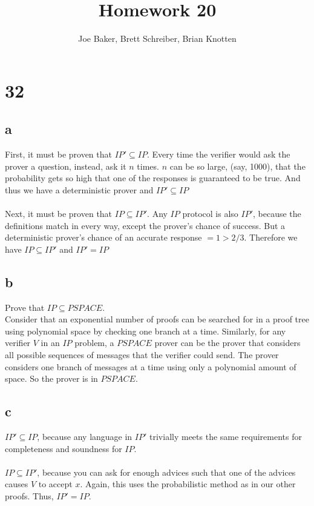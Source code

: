 \documentclass[letterpaper,notitlepage,twoside]{article}
\begin{document}
\title{Homework 20}
\author{Joe Baker, Brett Schreiber, Brian Knotten}
\maketitle

\section*{32}
\subsection*{a}
First, it must be proven that $IP' \subseteq IP$.
Every time the verifier would ask the prover a question, instead, ask it $n$ times. $n$ can be so large, (say, 1000), that the
probability gets so high that one of the responses is guaranteed to be true. And thus we have a deterministic prover and $IP' \subseteq IP$ \\\\
Next, it must be proven that $IP \subseteq IP'$.
Any $IP$ protocol is also $IP'$, because the definitions match in every way, except the prover's chance of success.
But a deterministic prover's chance of an accurate response $= 1 > 2/3$. Therefore we have $IP \subseteq IP'$ and $IP' = IP$

\subsection*{b}
Prove that $IP \subseteq PSPACE$. \\
Consider that an exponential number of proofs can be searched for in a proof tree using polynomial space by checking one branch at a time. Similarly, for any verifier $V$ in an $IP$ problem, a $PSPACE$ prover can be the prover that considers all possible sequences of messages that the verifier could send. The prover considers one branch of messages at a time using only a polynomial amount of space. So the prover is in $PSPACE$.

\subsection*{c}
$IP' \subseteq IP$, because any language in $IP'$ trivially meets the same requirements for completeness and soundness for $IP$. \\\\
$IP \subseteq IP'$, because you can ask for enough advices such that one of the advices causes $V$ to accept $x$. Again, this uses the probabilistic method as in our other proofs. Thus, $IP' = IP$.
\end{document}
